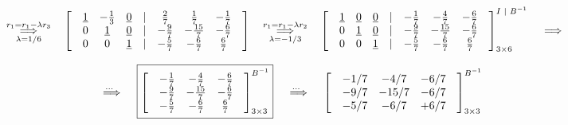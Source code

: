 \documentclass[fleqn]{article}
\begin{document}
\[
\hspace{0.321cm} \overset{r_1=r_1-\lambda r_3}{\underset{\lambda=1/6}{\implies}} \hspace{0.321cm}
\begin{bmatrix}
& \underline{1} & -\frac{1}{3} & \underline{0} & | & \frac{2}{7} & \frac{1}{7} & -\frac{1}{7} & \\
& 0 & \underline{1} & \underline{0} & | & -\frac{9}{7} & -\frac{15}{7} & -\frac{6}{7} & \\
& 0 & 0 & \underline{1} & | & -\frac{5}{7} & -\frac{6}{7} & \frac{6}{7} & 
\end{bmatrix}
\hspace{0.321cm} \overset{r_1=r_1-\lambda r_2}{\underset{\lambda=-1/3}{\implies}} \hspace{0.321cm}
\begin{bmatrix}
& \underline{1} & \underline{0} & \underline{0} & | & -\frac{1}{7} & -\frac{4}{7} & -\frac{6}{7} & \\
& 0 & \underline{1} & \underline{0} & | & -\frac{9}{7} & -\frac{15}{7} & -\frac{6}{7} & \\
& 0 & 0 & \underline{1} & | & -\frac{5}{7} & -\frac{6}{7} & \frac{6}{7} & 
\end{bmatrix}_{3 \times 6}^{I \hspace{0.1cm} | \hspace{0.1cm} B^{-1}}
\hspace{0.321cm} \overset{}{\underset{}{\implies}} \hspace{0.321cm}
\]

\[
\hspace{0.321cm} \overset{... \hspace{0.150cm}}{\implies} \hspace{0.321cm}
\boxed
{
\begin{bmatrix}
& -\frac{1}{7} & -\frac{4}{7} & -\frac{6}{7} & \\
& -\frac{9}{7} & -\frac{15}{7} & -\frac{6}{7} & \\
& -\frac{5}{7} & -\frac{6}{7} & \frac{6}{7} & 
\end{bmatrix}_{3 \times 3}^{B^{-1}}
}
\hspace{0.321cm} \overset{... \hspace{0.150cm}}{\implies} \hspace{0.321cm}
{
\begin{bmatrix}
& - {1}/{7} & - {4}/{7} & - {6}/{7} & \\
& - {9}/{7} & - {15}/{7} & - {6}/{7} & \\
& - {5}/{7} & - {6}/{7} & + {6}/{7} & 
\end{bmatrix}_{3 \times 3}^{B^{-1}}
}
\]
\end{document}
